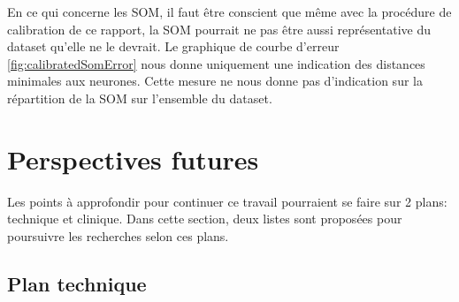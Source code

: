 	En ce qui concerne les SOM, il faut être conscient que même avec la procédure de calibration de ce rapport, la SOM pourrait ne pas être aussi représentative du dataset qu'elle ne le devrait. Le graphique de courbe d'erreur \autoref{fig:calibratedSomError} nous donne uniquement une indication des distances minimales aux neurones. Cette mesure ne nous donne pas d'indication sur la répartition de la SOM sur l'ensemble du dataset. 


\section{Perspectives futures}
	

	Les points à approfondir pour continuer ce travail pourraient se faire sur 2 plans: technique et clinique. Dans cette section, deux listes sont proposées pour poursuivre les recherches selon ces plans.

\subsection*{Plan technique}
	

